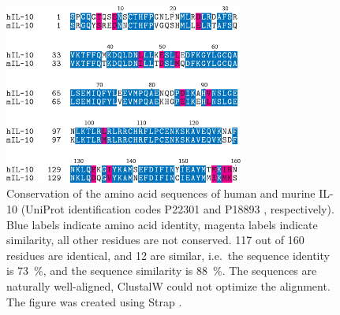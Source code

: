 \begin{figure}
\centering
\includegraphics[width=0.7\textwidth]{gfx/background/murine_human_Il10_alignment_01.pdf}
\caption[]{
Conservation of the amino acid sequences of human and murine IL-10 (UniProt
identification codes P22301 and P18893 \cite{TheUniProtConsortium01012014},
respectively). Blue labels indicate amino acid identity, magenta labels indicate
similarity, all other residues are not conserved. 117 out of 160 residues are
identical, and 12 are similar, i.e.\ the sequence identity is \SI{73}{\percent},
and the sequence similarity is \SI{88}{\percent}. The sequences are naturally
well-aligned, ClustalW \cite{clustalw_2008} could not optimize the alignment.
The figure was created using Strap \cite{strap_website}.}
\label{fig:bg:murine_human_il10_sequence}
\end{figure}




